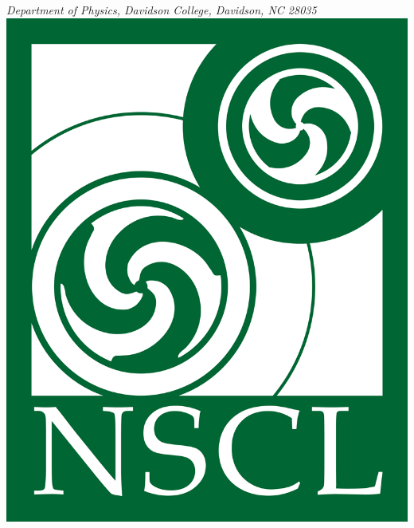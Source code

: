 \documentclass[ansiepaper,portrait]{baposter}
\begin{document}
\begin{poster}
{\smaller \it {Department of Physics, Davidson College, Davidson, NC 28035}} %
{\includegraphics[scale=0.3]{nscl_logo.png}} %


\end{poster}
\end{document}
